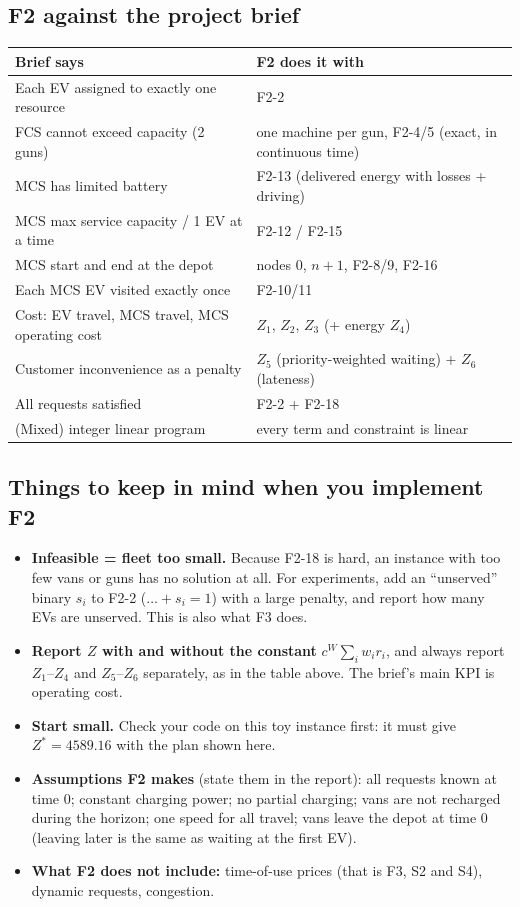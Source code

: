 \documentclass[11pt,a4paper]{article}
\begin{document}
\subsection*{F2 against the project brief}
\begin{center}
\renewcommand{\arraystretch}{1.2}
\small
\begin{tabularx}{\textwidth}{@{}>{\raggedright\arraybackslash}p{6.4cm}X@{}}
\toprule
\textbf{Brief says} & \textbf{F2 does it with} \\
\midrule
Each EV assigned to exactly one resource & F2-2 \\
FCS cannot exceed capacity (2 guns) & one machine per gun, F2-4/5 (exact, in continuous time) \\
MCS has limited battery & F2-13 (delivered energy with losses + driving) \\
MCS max service capacity / 1 EV at a time & F2-12 / F2-15 \\
MCS start and end at the depot & nodes $0$, $n{+}1$, F2-8/9, F2-16 \\
Each MCS EV visited exactly once & F2-10/11 \\
Cost: EV travel, MCS travel, MCS operating cost & $Z_1$, $Z_2$, $Z_3$ (+ energy $Z_4$) \\
Customer inconvenience as a penalty & $Z_5$ (priority-weighted waiting) + $Z_6$ (lateness) \\
All requests satisfied & F2-2 + F2-18 \\
(Mixed) integer linear program & every term and constraint is linear \\
\bottomrule
\end{tabularx}
\end{center}

\subsection*{Things to keep in mind when you implement F2}
\begin{itemize}[leftmargin=1.4em,itemsep=2pt]
  \item \textbf{Infeasible = fleet too small.} Because F2-18 is hard, an instance with too few vans or guns has no solution at all. For experiments, add an ``unserved'' binary $s_i$ to F2-2 ($\dots+s_i=1$) with a large penalty, and report how many EVs are unserved. This is also what F3 does.
  \item \textbf{Report $Z$ with and without the constant} $c^W\sum_iw_ir_i$, and always report $Z_1$--$Z_4$ and $Z_5$--$Z_6$ separately, as in the table above. The brief's main KPI is operating cost.
  \item \textbf{Start small.} Check your code on this toy instance first: it must give $Z^*=4589.16$ with the plan shown here.
  \item \textbf{Assumptions F2 makes} (state them in the report): all requests known at time 0; constant charging power; no partial charging; vans are not recharged during the horizon; one speed for all travel; vans leave the depot at time 0 (leaving later is the same as waiting at the first EV).
  \item \textbf{What F2 does not include:} time-of-use prices (that is F3, S2 and S4), dynamic requests, congestion.
\end{itemize}
\end{document}

